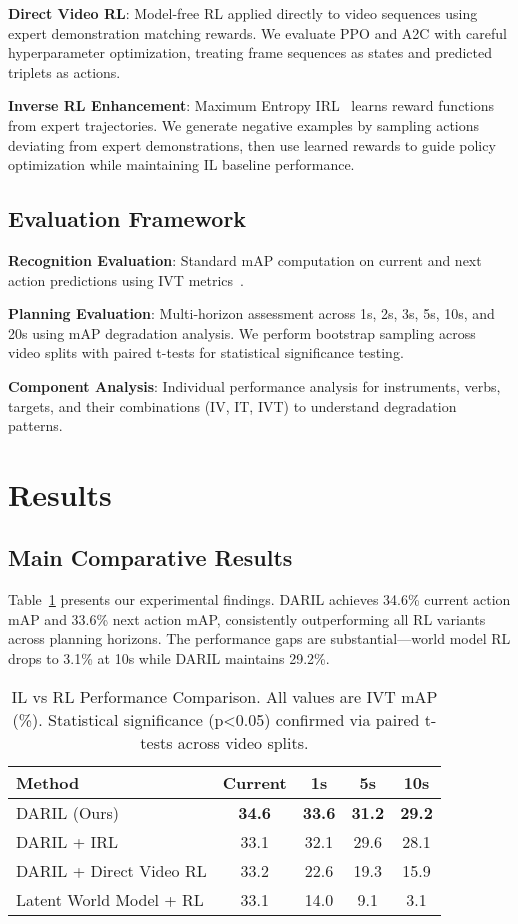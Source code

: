 \documentclass[runningheads]{llncs}
\begin{document}
\textbf{Direct Video RL}: Model-free RL applied directly to video sequences using expert demonstration matching rewards. We evaluate PPO and A2C with careful hyperparameter optimization, treating frame sequences as states and predicted triplets as actions.

\textbf{Inverse RL Enhancement}: Maximum Entropy IRL~\cite{ziebart2008maximum} learns reward functions from expert trajectories. We generate negative examples by sampling actions deviating from expert demonstrations, then use learned rewards to guide policy optimization while maintaining IL baseline performance.

\subsection{Evaluation Framework}

\textbf{Recognition Evaluation}: Standard mAP computation on current and next action predictions using IVT metrics~\cite{nwoye2022data}.

\textbf{Planning Evaluation}: Multi-horizon assessment across 1s, 2s, 3s, 5s, 10s, and 20s using mAP degradation analysis. We perform bootstrap sampling across video splits with paired t-tests for statistical significance testing.

\textbf{Component Analysis}: Individual performance analysis for instruments, verbs, targets, and their combinations (IV, IT, IVT) to understand degradation patterns.

\section{Results}

\subsection{Main Comparative Results}

Table~\ref{tab:main_results} presents our experimental findings. DARIL achieves 34.6\% current action mAP and 33.6\% next action mAP, consistently outperforming all RL variants across planning horizons. The performance gaps are substantial—world model RL drops to 3.1\% at 10s while DARIL maintains 29.2\%.

\begin{table}[h]
\centering
\caption{IL vs RL Performance Comparison. All values are IVT mAP (\%). Statistical significance (p<0.05) confirmed via paired t-tests across video splits.}
\label{tab:main_results}
\begin{tabular}{lcccc}
\toprule
\textbf{Method} & \textbf{Current} & \textbf{1s} & \textbf{5s} & \textbf{10s} \\
\midrule
DARIL (Ours) & \textbf{34.6} & \textbf{33.6} & \textbf{31.2} & \textbf{29.2} \\
DARIL + IRL & 33.1 & 32.1 & 29.6 & 28.1 \\
DARIL + Direct Video RL & 33.2 & 22.6 & 19.3 & 15.9 \\
Latent World Model + RL & 33.1 & 14.0 & 9.1 & 3.1 \\
\bottomrule
\end{tabular}
\end{table}
\end{document}
